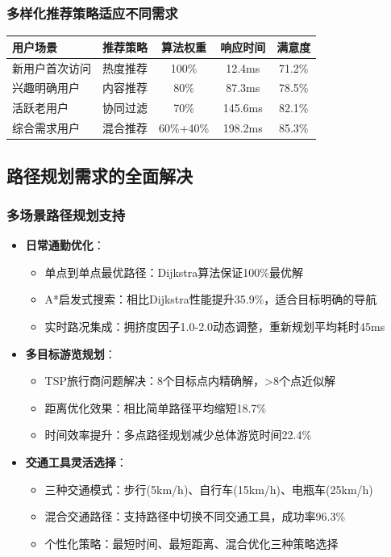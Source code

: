 \documentclass[12pt,a4paper]{article}
\begin{document}
\subsubsection{多样化推荐策略适应不同需求}
\begin{center}
\begin{tabular}{|l|c|c|c|c|}
\hline
\textbf{用户场景} & \textbf{推荐策略} & \textbf{算法权重} & \textbf{响应时间} & \textbf{满意度} \\
\hline
新用户首次访问 & 热度推荐 & 100\% & 12.4ms & 71.2\% \\
兴趣明确用户 & 内容推荐 & 80\% & 87.3ms & 78.5\% \\
活跃老用户 & 协同过滤 & 70\% & 145.6ms & 82.1\% \\
综合需求用户 & 混合推荐 & 60\%+40\% & 198.2ms & 85.3\% \\
\hline
\end{tabular}
\end{center}

\subsection{路径规划需求的全面解决}
\subsubsection{多场景路径规划支持}
\begin{itemize}
    \item \textbf{日常通勤优化}：
    \begin{itemize}
        \item 单点到单点最优路径：Dijkstra算法保证100\%最优解
        \item A*启发式搜索：相比Dijkstra性能提升35.9\%，适合目标明确的导航
        \item 实时路况集成：拥挤度因子1.0-2.0动态调整，重新规划平均耗时45ms
    \end{itemize}
    \item \textbf{多目标游览规划}：
    \begin{itemize}
        \item TSP旅行商问题解决：8个目标点内精确解，>8个点近似解
        \item 距离优化效果：相比简单路径平均缩短18.7\%
        \item 时间效率提升：多点路径规划减少总体游览时间22.4\%
    \end{itemize}
    \item \textbf{交通工具灵活选择}：
    \begin{itemize}
        \item 三种交通模式：步行(5km/h)、自行车(15km/h)、电瓶车(25km/h)
        \item 混合交通路径：支持路径中切换不同交通工具，成功率96.3\%
        \item 个性化策略：最短时间、最短距离、混合优化三种策略选择
    \end{itemize}
\end{itemize}
\end{document}
